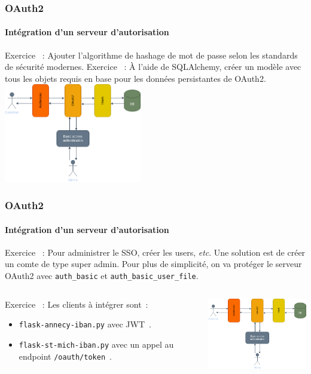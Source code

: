 \documentclass{beamer}
\begin{document}
    \begin{frame}
        \frametitle{OAuth2}
        \framesubtitle{Intégration d'un serveur d'autorisation}
        \transdissolve
        Exercice \execcounterdispinc{}~:
        Ajouter l'algorithme de hashage de mot de passe selon les standards de sécurité modernes.
        \bigbreak
        Exercice \execcounterdispinc{}~:
        À l'aide de SQLAlchemy, créer un modèle avec tous les objets requis en base pour les données persistantes de OAuth2.
        \bigbreak
        \centering
        \includegraphics[width=6cm]{image/OAuth2-integration.drawio}
    \end{frame}

    \begin{frame}
        \frametitle{OAuth2}
        \framesubtitle{Intégration d'un serveur d'autorisation}
        \transdissolve
        Exercice \execcounterdispinc{}~:
        Pour administrer le SSO, créer les users, \textit{etc}.
        Une solution est de créer un comte de type super admin.
        Pour plus de simplicité, on va protéger le serveur OAuth2 avec \lstinline{auth_basic} et \lstinline{auth_basic_user_file}.
        \begin{columns}
            \begin{column}{0.6\textwidth}
                Exercice \execcounterdispinc{}~:
                Les clients à intégrer sont~:
                \begin{itemize}
                    \item \lstinline{flask-annecy-iban.py} avec JWT~.
                    \item \lstinline{flask-st-mich-iban.py} avec un appel au endpoint \lstinline{/oauth/token}~.
                \end{itemize}
            \end{column}
            \begin{column}{0.4\textwidth}
                \centering
                \includegraphics[width=6cm]{image/OAuth2-integration.drawio}
            \end{column}
        \end{columns}
    \end{frame}
\end{document}
